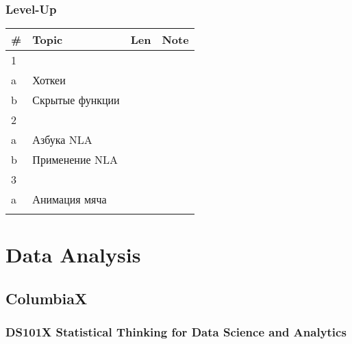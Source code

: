 \documentclass[a4paper,12pt]{article} %
\begin{document}
\subsubsection{Level-Up}
\begin{longtable}{|l|p{11cm}|l|l|}
	\hline
	\# & Topic & Len & Note \\
	\hline
	1 &  &  &  \\
	a & Хоткеи &  &  \\
	b & Скрытые функции &  &  \\
	\hline
	2 &  &  &  \\
	a & Азбука NLA &  &  \\
	b & Применение NLA &  &  \\
	\hline
	3 &  &  &  \\
	a & Анимация мяча &  &  \\
	\hline
	&  &  &  \\
	\hline
\end{longtable}


\newpage
\section{Data Analysis}
\subsection{ColumbiaX}

\subsubsection{DS101X Statistical Thinking for Data Science and Analytics}
\end{document}
